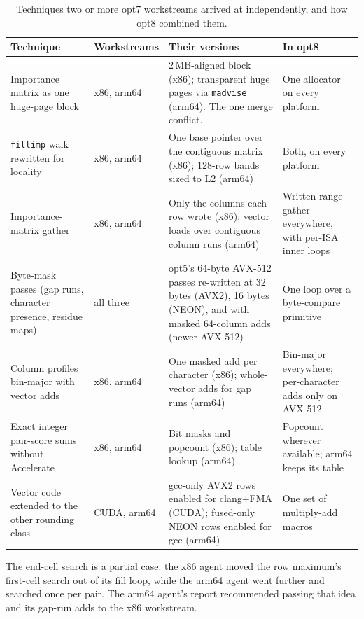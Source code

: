 \documentclass[11pt]{article}
\newcommand{\code}[1]{\texttt{#1}}
\begin{document}
\begin{table}[h]
\centering\small
\caption{Techniques two or more opt7 workstreams arrived at independently, and how opt8 combined them.}
\label{tab:convergence}
\begin{tabularx}{\linewidth}{>{\raggedright\arraybackslash}p{3.3cm}>{\raggedright\arraybackslash}p{1.5cm}X>{\raggedright\arraybackslash}p{3.5cm}}
\toprule
Technique & Work\-streams & Their versions & In opt8 \\
\midrule
Importance matrix as one huge-page block & x86, arm64 & 2\,MB-aligned block (x86); transparent huge pages via \code{madvise} (arm64). The one merge conflict. & One allocator on every platform \\
\code{fillimp} walk rewritten for locality & x86, arm64 & One base pointer over the contiguous matrix (x86); 128-row bands sized to L2 (arm64) & Both, on every platform \\
Importance-matrix gather & x86, arm64 & Only the columns each row wrote (x86); vector loads over contiguous column runs (arm64) & Written-range gather everywhere, with per-ISA inner loops \\
Byte-mask passes (gap runs, character presence, residue maps) & all three & opt5's 64-byte AVX-512 passes re-written at 32 bytes (AVX2), 16 bytes (NEON), and with masked 64-column adds (newer AVX-512) & One loop over a byte-compare primitive \\
Column profiles bin-major with vector adds & x86, arm64 & One masked add per character (x86); whole-vector adds for gap runs (arm64) & Bin-major everywhere; per-character adds only on AVX-512 \\
Exact integer pair-score sums without Accelerate & x86, arm64 & Bit masks and popcount (x86); table lookup (arm64) & Popcount wherever available; arm64 keeps its table \\
Vector code extended to the other rounding class & CUDA, arm64 & gcc-only AVX2 rows enabled for clang+FMA (CUDA); fused-only NEON rows enabled for gcc (arm64) & One set of multiply-add macros \\
\bottomrule
\end{tabularx}
\end{table}

The end-cell search is a partial case: the x86 agent moved the row maximum's first-cell search
out of its fill loop, while the arm64 agent went further and searched once per pair. The arm64
agent's report recommended passing that idea and its gap-run adds to the x86 workstream.
\end{document}
